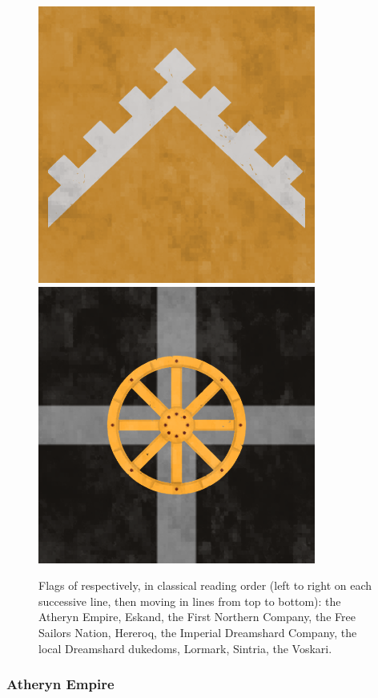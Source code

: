 \begin{figure}[!ht]
        \includegraphics[scale=0.25]{img/flag/sintria.png}
        \includegraphics[scale=0.25]{img/flag/voskari.png}

    \caption{Flags of respectively, in classical reading order (left to right on each successive line, then moving in lines from top to bottom): the Atheryn Empire, Eskand, the First Northern Company, the Free Sailors Nation, Hereroq, the Imperial Dreamshard Company, the local Dreamshard dukedoms, Lormark, Sintria, the Voskari.}
    \label{flags}
\end{figure}








\subsubsection{Atheryn Empire}



